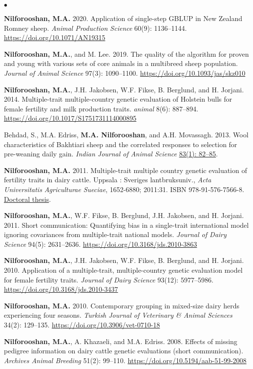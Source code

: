 \documentclass[margin,line]{res}
\newenvironment{list2}{
  \begin{list}{$\bullet$}{%
      \setlength{\itemsep}{0in}
      \setlength{\parsep}{0in} \setlength{\parskip}{0in}
      \setlength{\topsep}{0in} \setlength{\partopsep}{0in}
      \setlength{\leftmargin}{0.2in}}}{\end{list}}
\begin{document}
\begin{resume}
\begin{list2}
    \item {\bf Nilforooshan, M.A.} 2020. Application of single-step GBLUP in New Zealand Romney sheep. {\em Animal Production Science} 60(9): 1136--1144. \url{https://doi.org/10.1071/AN19315}
    \item {\bf Nilforooshan, M.A.}, and M. Lee. 2019. The quality of the algorithm for proven and young with various sets of core animals in a multibreed sheep population. {\em Journal of Animal Science} 97(3): 1090--1100. \url{https://doi.org/10.1093/jas/skz010}
    \item {\bf Nilforooshan, M.A.}, J.H. Jakobsen, W.F. Fikse, B. Berglund, and H. Jorjani. 2014. Multiple-trait multiple-country genetic evaluation of Holstein bulls for female fertility and milk production traits. {\em animal} 8(6): 887--894. \url{https://doi.org/10.1017/S1751731114000895}
    \item Behdad, S., M.A. Edriss, {\bf M.A. Nilforooshan}, and A.H. Movassagh. 2013. Wool characteristics of Bakhtiari sheep and the correlated responses to selection for pre-weaning daily gain. {\em Indian Journal of Animal Science} \href{http://epubs.icar.org.in/ejournal/index.php/IJAnS/article/view/26453}{83(1): 82--85}.
    \item {\bf Nilforooshan, M.A.} 2011. Multiple-trait multiple country genetic evaluation of fertility traits in dairy cattle. Uppsala : Sveriges lantbruksuniv., {\em Acta Universitatis Agriculturae Sueciae}, 1652-6880; 2011:31. ISBN 978-91-576-7566-8. \href{https://pub.epsilon.slu.se/8094}{Doctoral thesis}.
    \item {\bf Nilforooshan, M.A.}, W.F. Fikse, B. Berglund, J.H. Jakobsen, and H. Jorjani. 2011. Short communication: Quantifying bias in a single-trait international model ignoring covariances from multiple-trait national models. {\em Journal of Dairy Science} 94(5): 2631--2636. \url{https://doi.org/10.3168/jds.2010-3863}
    \item {\bf Nilforooshan, M.A.}, J.H. Jakobsen, W.F. Fikse, B. Berglund, and H. Jorjani. 2010. Application of a multiple-trait, multiple-country genetic evaluation model for female fertility traits. {\em Journal of Dairy Science} 93(12): 5977--5986. \url{https://doi.org/10.3168/jds.2010-3437}
    \item {\bf Nilforooshan, M.A.} 2010. Contemporary grouping in mixed-size dairy herds experiencing four seasons. {\em Turkish Journal of Veterinary \& Animal Sciences} 34(2): 129--135. \url{https://doi.org/10.3906/vet-0710-18}
    \item {\bf Nilforooshan, M.A.}, A. Khazaeli, and M.A. Edriss. 2008. Effects of missing pedigree information on dairy cattle genetic evaluations (short communication). {\em Archives Animal Breeding} 51(2): 99--110. \url{https://doi.org/10.5194/aab-51-99-2008}

\end{list2}
\end{resume}
\end{document}
